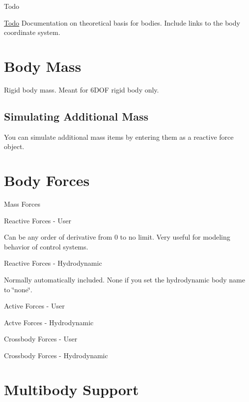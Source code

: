 \begin{DoxyRefDesc}{Todo}
\item[\hyperlink{todo__todo000002}{Todo}]Documentation on theoretical basis for bodies. Include links to the body coordinate system.\end{DoxyRefDesc}


\section*{Body Mass}

Rigid body mass. Meant for 6\-D\-O\-F rigid body only.

\subsection*{Simulating Additional Mass}

You can simulate additional mass items by entering them as a reactive force object.

\section*{Body Forces}


\begin{DoxyItemize}
\item Mass Forces
\item Reactive Forces -\/ User
\begin{DoxyItemize}
\item Can be any order of derivative from 0 to no limit. Very useful for modeling behavior of control systems.
\end{DoxyItemize}
\item Reactive Forces -\/ Hydrodynamic
\begin{DoxyItemize}
\item Normally automatically included. None if you set the hydrodynamic body name to \char`\"{}none\char`\"{}.
\end{DoxyItemize}
\item Active Forces -\/ User
\item Actve Forces -\/ Hydrodynamic
\item Crossbody Forces -\/ User
\item Crossbody Forces -\/ Hydrodynamic
\end{DoxyItemize}

\section*{Multibody Support}

